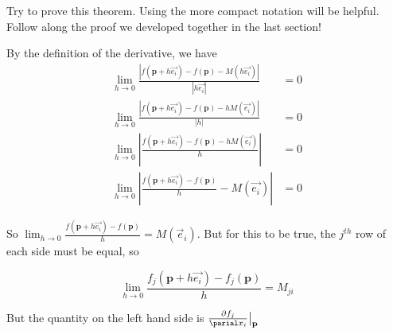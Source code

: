 \documentclass{ximera}
\begin{document}
	Try to prove this theorem.  Using the more compact notation will be helpful.  Follow along the proof we developed together in the last section!
	\begin{free-response}
		By the definition of the derivative,  we have 
		\begin{align*}
		 \lim_{h \to 0} \frac{\left| f(\mathbf{p}+h\vec{e_i}) - f(\mathbf{p}) - M(h\vec{e_i}) \right|}{\left| h\vec{e_i}\right|} &= 0\\
		 \lim_{h \to 0} \frac{\left| f(\mathbf{p}+h\vec{e_i}) - f(\mathbf{p}) - hM(\vec{e_i}) \right|}{|h|} &= 0\\
		 \lim_{h \to 0} \left| \frac{f(\mathbf{p}+h\vec{e_i}) - f(\mathbf{p}) - hM(\vec{e_i})}{h} \right|&= 0\\
		  \lim_{h \to 0} \left| \frac{f(\mathbf{p}+h\vec{e_i}) - f(\mathbf{p})}{h} - M(\vec{e_i}) \right|&= 0
		 \end{align*}
		 
		 So $\lim_{h \to 0}  \frac{f(\mathbf{p}+h\vec{e_i}) - f(\mathbf{p})}{h}  = M (\vec{e}_i)$.  But for this to be true, the $j^{th}$ row of each side must be equal, so 
		 
		\[\lim_{h \to 0}  \frac{f_j(\mathbf{p}+h\vec{e_i}) - f_j(\mathbf{p})}{h}  = M _{ji}\]
		
		But the quantity on the left hand side is $\frac{\partial f_j}{\parial x_i}\big|_{\mathbf{p}}$
	\end{free-response}
	
\end{document}
